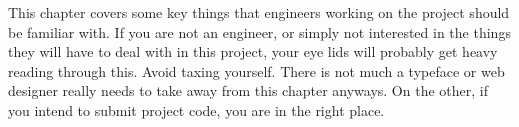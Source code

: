 

This chapter covers some key things that engineers working on the project should be familiar with. If you are not an engineer, or simply not interested in the things they will have to deal with in this project, your eye lids will probably get heavy reading through this. Avoid taxing yourself. There is not much a typeface or web designer really needs to take away from this chapter anyways. On the other, if you intend to submit project code, you are in the right place.






\StopChapter

